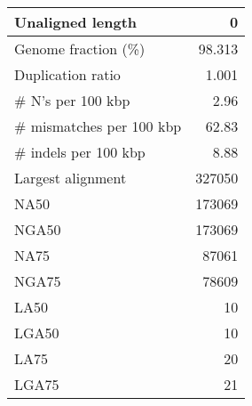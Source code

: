 \documentclass[12pt,a4paper]{article}
\begin{document}
\begin{table}[ht]
\begin{center}
\begin{tabular}{|l*{1}{|r}|}
Unaligned length & 0 \\ \hline
Genome fraction (\%) & 98.313 \\ \hline
Duplication ratio & 1.001 \\ \hline
\# N's per 100 kbp & 2.96 \\ \hline
\# mismatches per 100 kbp & 62.83 \\ \hline
\# indels per 100 kbp & 8.88 \\ \hline
Largest alignment & 327050 \\ \hline
NA50 & 173069 \\ \hline
NGA50 & 173069 \\ \hline
NA75 & 87061 \\ \hline
NGA75 & 78609 \\ \hline
LA50 & 10 \\ \hline
LGA50 & 10 \\ \hline
LA75 & 20 \\ \hline
LGA75 & 21 \\ \hline
\end{tabular}
\end{center}
\end{table}
\end{document}
